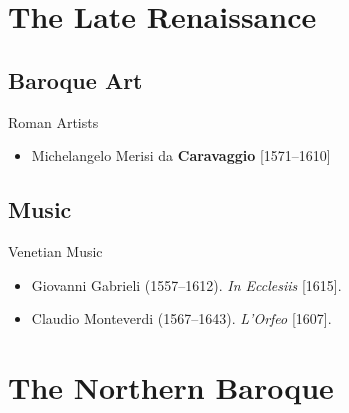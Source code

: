 

\section{The Late Renaissance}
\subsection{Baroque Art}
\begin{frame}{Roman Artists}

	\begin{itemize}
		\item<1->Michelangelo Merisi da \textbf{Caravaggio} [1571--1610]
	\end{itemize}
\end{frame}

\subsection{Music}
\begin{frame}{Venetian Music}
	\begin{itemize}
		\item<2->Giovanni Gabrieli (1557--1612). \emph{In Ecclesiis} [1615].
		\item<3->Claudio Monteverdi (1567--1643). \emph{L'Orfeo} [1607].
	\end{itemize}
\end{frame}


\section{The Northern Baroque}
